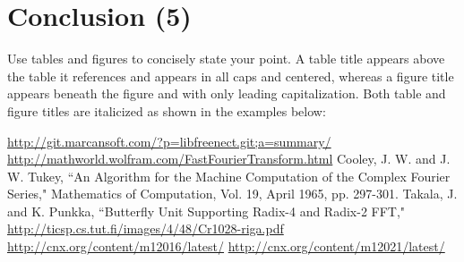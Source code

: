 \documentclass[12pt, letterpaper]{article}
\begin{document}
\section{Conclusion (5)}
Use tables and figures to concisely state your point. A table title appears above the table it references and appears in all caps and centered, whereas a figure title appears beneath the figure and with only leading capitalization. Both table and figure titles are italicized as shown in the examples below:



\begin{thebibliography}{10}
 \url{http://git.marcansoft.com/?p=libfreenect.git;a=summary/}
 \url{http://mathworld.wolfram.com/FastFourierTransform.html}
 	Cooley, J. W. and J. W. Tukey, ``An Algorithm for the Machine Computation of the Complex Fourier Series," Mathematics of Computation, Vol. 19, April 1965, pp. 297-301.
 Takala, J. and K. Punkka, ``Butterfly Unit Supporting Radix-4 and Radix-2 FFT," \url{http://ticsp.cs.tut.fi/images/4/48/Cr1028-riga.pdf}
 \url{http://cnx.org/content/m12016/latest/}
 \url{http://cnx.org/content/m12021/latest/}
\end{thebibliography}
\end{document}
